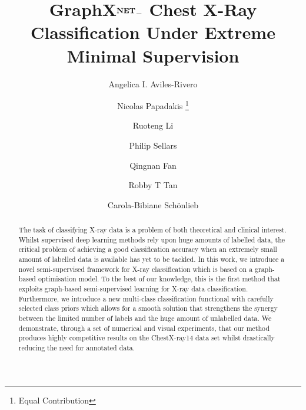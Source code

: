 \documentclass[runningheads]{llncs}
\begin{document}
\title{GraphX$^\textbf{\small NET} -$ Chest X-Ray Classification Under Extreme Minimal Supervision}




\author{
Angelica I. Aviles-Rivero \and
Nicolas Papadakis \thanks{Equal Contribution}   \and
Ruoteng Li  \and
Philip Sellars  \and
Qingnan Fan  \and
Robby T Tan \and
Carola-Bibiane Sch\"onlieb
}









\maketitle

\begin{abstract}
The task of classifying X-ray data is a problem of both theoretical and clinical interest. Whilst supervised deep learning methods rely upon huge amounts of labelled data, the critical problem of achieving a good classification accuracy when an extremely small amount of labelled data is available has yet to be tackled. In this work, we introduce a novel semi-supervised framework for X-ray classification which is based on a graph-based optimisation model. To the best of our knowledge, this is the first method that exploits graph-based semi-supervised learning for X-ray data classification. Furthermore, we introduce a new multi-class classification functional with carefully selected class priors which allows for a smooth solution that strengthens the synergy between the limited number of labels and the huge amount of unlabelled data. We demonstrate, through a set of numerical and visual experiments, that our method produces highly competitive results on the ChestX-ray14 data set whilst drastically reducing the need for annotated data.



\end{abstract}
\end{document}
